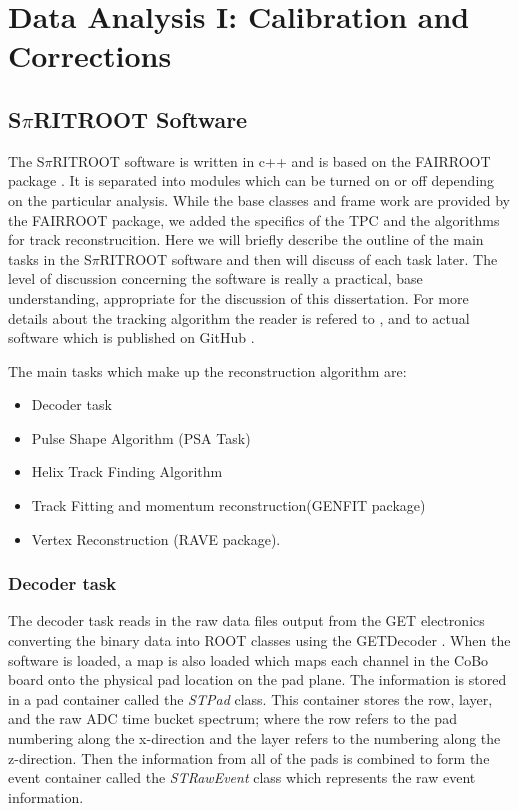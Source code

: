 \chapter{Data Analysis I: Calibration and Corrections}
\label{chap:data1}

\section{S$\pi$RITROOT Software}
\label{sec:software}

The S$\pi$RITROOT software is written in c++ and is based on the FAIRROOT package \cite{fairroot}. It is separated into modules which can be turned on or off depending on the particular analysis. While the base classes and frame work are provided by the FAIRROOT package, we added the specifics of the \spirit TPC and the algorithms for track reconstrucition. Here we will briefly describe the outline of the main tasks in the S$\pi$RITROOT software and then will discuss of each task later. The level of discussion concerning the software is really a practical, base understanding, appropriate for the discussion of this dissertation. For more details about the tracking algorithm the reader is refered to \cite{spiritroot_paper}, and to actual software which is published on GitHub \cite{spiritroot_git}. 

The main tasks which make up the reconstruction algorithm are:

\begin{itemize}
  \item Decoder task
  \item Pulse Shape Algorithm (PSA Task)
  \item Helix Track Finding Algorithm
  \item Track Fitting and momentum reconstruction(GENFIT package)
  \item Vertex Reconstruction (RAVE package).
\end{itemize}


\subsection{Decoder task}
The decoder task reads in the raw data files output from the GET electronics converting the binary data into \spirit ROOT classes using the GETDecoder \cite{getdecoder}. When the software is loaded, a map is also loaded which maps each channel in the CoBo board onto the physical pad location on the pad plane. The information is stored in a pad container called the \emph{STPad} class. This container stores the row, layer, and the raw ADC time bucket spectrum; where the row refers to the pad numbering along the x-direction and the layer refers to the numbering along the z-direction. Then the information from all of the pads is combined to form the event container called the \emph{STRawEvent} class which represents the raw event information. 

